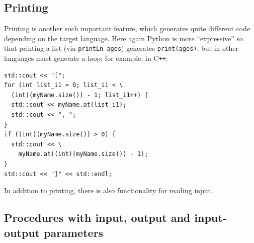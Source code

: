 \documentclass[sigplan,review,anonymous,prologue,dvipsnames]{acmart}
\newcommand{\Cplusplus}{C\texttt{++}}
\begin{document}
\subsection{Printing}

Printing is another such important feature, which generates quite
different code depending on the target language.  Here again Python
is more ``expressive'' so that printing a list (via
\verb|printLn ages|) generates \verb|print(ages)|, but in other languages
must generate a loop; for example, in \Cplusplus:
\begin{lstlisting}
std::cout << "[";
for (int list_i1 = 0; list_i1 < \
  (int)(myName.size()) - 1; list_i1++) {
  std::cout << myName.at(list_i1);
  std::cout << ", ";
}
if ((int)(myName.size()) > 0) {
  std::cout << \
    myName.at((int)(myName.size()) - 1);
}
std::cout << "]" << std::endl;
\end{lstlisting}
In addition to printing, there is also functionality for reading input.

\subsection{Procedures with input, output and input-output parameters}
\end{document}
